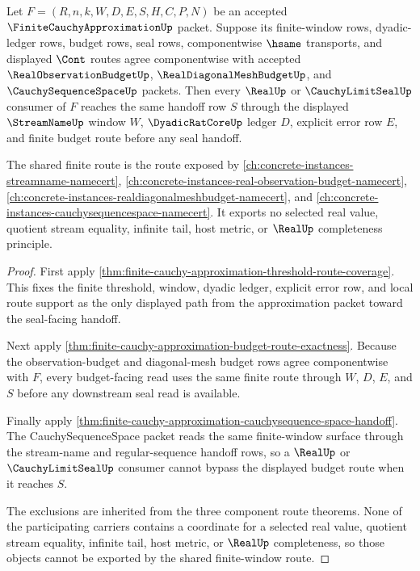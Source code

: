 \begin{theorem}
\label{thm:finite-cauchy-approximation-shared-window-budget-exhaustion}
Let $F=(R,n,k,W,D,E,S,H,C,P,N)$ be an accepted $\FiniteCauchyApproximationUp$ packet. Suppose its finite-window rows, dyadic-ledger rows, budget rows, seal rows, componentwise $\hsame$ transports, and displayed $\Cont$ routes agree componentwise with accepted $\RealObservationBudgetUp$, $\RealDiagonalMeshBudgetUp$, and $\CauchySequenceSpaceUp$ packets. Then every $\RealUp$ or $\CauchyLimitSealUp$ consumer of $F$ reaches the same handoff row $S$ through the displayed $\StreamNameUp$ window $W$, $\DyadicRatCoreUp$ ledger $D$, explicit error row $E$, and finite budget route before any seal handoff.

The shared finite route is the route exposed by \autoref{ch:concrete-instances-streamname-namecert}, \autoref{ch:concrete-instances-real-observation-budget-namecert}, \autoref{ch:concrete-instances-realdiagonalmeshbudget-namecert}, and \autoref{ch:concrete-instances-cauchysequencespace-namecert}. It exports no selected real value, quotient stream equality, infinite tail, host metric, or $\RealUp$ completeness principle.
\end{theorem}
\begin{proof}
First apply \autoref{thm:finite-cauchy-approximation-threshold-route-coverage}. This fixes the finite threshold, window, dyadic ledger, explicit error row, and local route support as the only displayed path from the approximation packet toward the seal-facing handoff.

Next apply \autoref{thm:finite-cauchy-approximation-budget-route-exactness}. Because the observation-budget and diagonal-mesh budget rows agree componentwise with $F$, every budget-facing read uses the same finite route through $W$, $D$, $E$, and $S$ before any downstream seal read is available.

Finally apply \autoref{thm:finite-cauchy-approximation-cauchysequence-space-handoff}. The CauchySequenceSpace packet reads the same finite-window surface through the stream-name and regular-sequence handoff rows, so a $\RealUp$ or $\CauchyLimitSealUp$ consumer cannot bypass the displayed budget route when it reaches $S$.

The exclusions are inherited from the three component route theorems. None of the participating carriers contains a coordinate for a selected real value, quotient stream equality, infinite tail, host metric, or $\RealUp$ completeness, so those objects cannot be exported by the shared finite-window route.
\end{proof}

